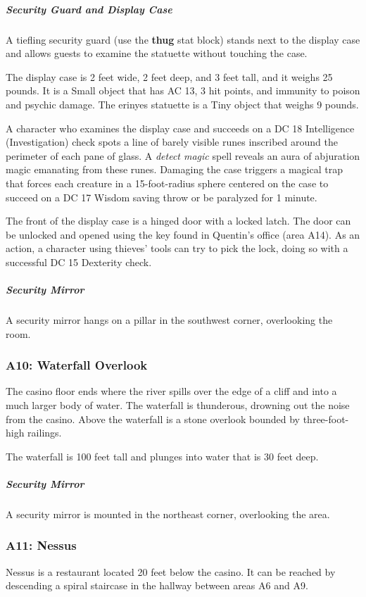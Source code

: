 \documentclass[10pt,a4paper,twoside,bg=print,twocolumn,openany,nodeprecatedcode]{dndbook}
\begin{document}
\subparagraph{Security Guard and Display Case}
A tiefling security guard (use the \textbf{thug} stat block) stands next to the display case and allows guests to examine the statuette without touching the case.

The display case is 2 feet wide, 2 feet deep, and 3 feet tall, and it weighs 25 pounds. It is a Small object that has AC 13, 3 hit points, and immunity to poison and psychic damage. The erinyes statuette is a Tiny object that weighs 9 pounds.

A character who examines the display case and succeeds on a DC 18 Intelligence (Investigation) check spots a line of barely visible runes inscribed around the perimeter of each pane of glass. A \textit{detect magic} spell reveals an aura of abjuration magic emanating from these runes. Damaging the case triggers a magical trap that forces each creature in a 15-foot-radius sphere centered on the case to succeed on a DC 17 Wisdom saving throw or be paralyzed for 1 minute.

The front of the display case is a hinged door with a locked latch. The door can be unlocked and opened using the key found in Quentin's office (area A14). As an action, a character using thieves' tools can try to pick the lock, doing so with a successful DC 15 Dexterity check.

\subparagraph{Security Mirror}
A security mirror hangs on a pillar in the southwest corner, overlooking the room.

\subsubsection{A10: Waterfall Overlook}
\begin{DndReadAloud}{}
The casino floor ends where the river spills over the edge of a cliff and into a much larger body of water. The waterfall is thunderous, drowning out the noise from the casino. Above the waterfall is a stone overlook bounded by three-foot-high railings.

\end{DndReadAloud}

The waterfall is 100 feet tall and plunges into water that is 30 feet deep.

\subparagraph{Security Mirror}
A security mirror is mounted in the northeast corner, overlooking the area.

\subsubsection{A11: Nessus}
Nessus is a restaurant located 20 feet below the casino. It can be reached by descending a spiral staircase in the hallway between areas A6 and A9.
\end{document}
